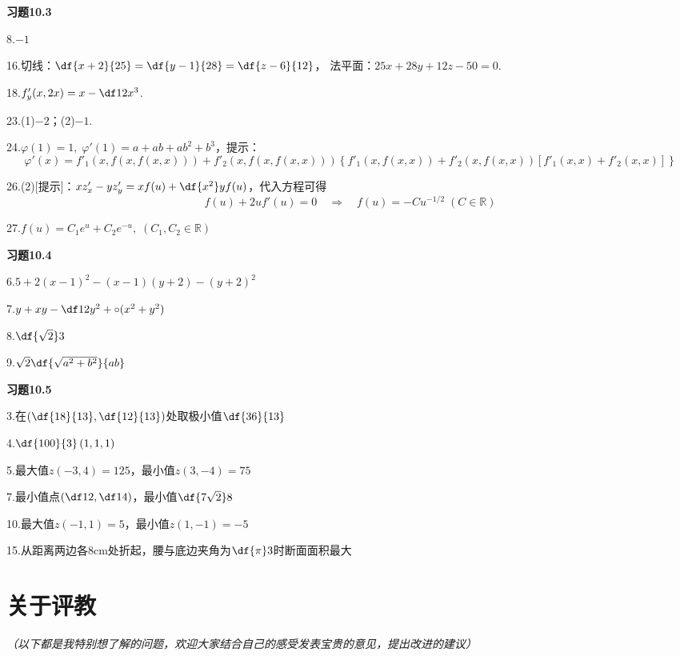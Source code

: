 {\bf 习题10.3}

8.$-1$

16.\;切线：$\df{x+2}{25}=\df{y-1}{28}=\df{z-6}{12}$，
法平面：$25x+28y+12z-50=0$.

18.$f'_y(x,2x)=x-\df12x^3$.

23.\;(1)$-2$；(2)$-1$.

24.\;$\varphi(1)=1,\;\varphi'(1)=a+ab+ab^2+b^3$，提示：
$$
	\varphi'(x)=f'_1(x,f(x,f(x,x)))+f'_2(x,f(x,f(x,x)))\left\{
	f'_1(x,f(x,x))+f'_2(x,f(x,x))[f'_1(x,x)+f'_2(x,x)]\right\}
$$

26.\;(2)[提示]：$xz'_x-yz'_y=xf(u)+\df{x^2}yf(u)$，代入方程可得
$$f(u)+2uf'(u)=0\quad\Rightarrow\quad f(u)=-Cu^{-1/2}\;(C\in\mathbb{R})$$

27.\;$f(u)=C_1e^u+C_2e^{-u},\;(C_1,C_2\in\mathbb{R})$

{\bf 习题10.4}

6.\;$5+2(x-1)^2-(x-1)(y+2)-(y+2)^2$

7.\;$y+xy-\df12y^2+\circ(x^2+y^2)$

8.\;$\df{\sqrt2}3$

9.\;$\sqrt2\df{\sqrt{a^2+b^2}}{ab}$

{\bf 习题10.5}

3.\;在$\left(\df{18}{13},\df{12}{13}\right)$处取极小值$\df{36}{13}$

4.\;$\df{100}{3}\left(1,1,1\right)$

5.\;最大值$z(-3,4)=125$，最小值$z(3,-4)=75$

7.\;最小值点$\left(\df12,\df14\right)$，最小值$\df{7\sqrt2}8$

10.\;最大值$z(-1,1)=5$，最小值$z(1,-1)=-5$

15.\;从距离两边各$8\mathrm{cm}$处折起，腰与底边夹角为$\df{\pi}3$时断面面积最大

\ifvisible

\section*{关于评教}

{\it （以下都是我特别想了解的问题，欢迎大家结合自己的感受发表宝贵的意见，提出改进的建议）}

